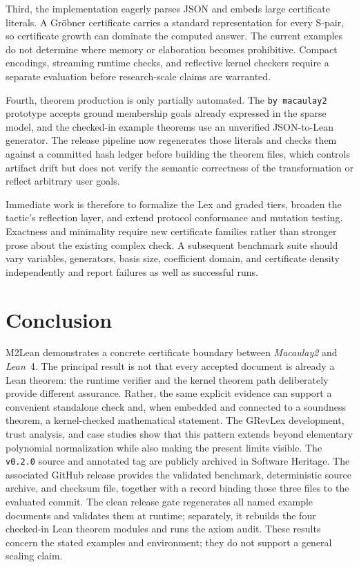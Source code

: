 \documentclass[11pt]{article}
\newcommand{\M}{\textit{Macaulay2}}
\newcommand{\lean}{\textit{Lean}}
\newcommand{\code}[1]{\texttt{#1}}
\begin{document}
Third, the implementation eagerly parses JSON and embeds large
certificate literals.  A Gr\"obner certificate carries a standard
representation for every S-pair, so certificate growth can dominate
the computed answer.  The current examples do not determine where
memory or elaboration becomes prohibitive.  Compact encodings,
streaming runtime checks, and reflective kernel checkers require a
separate evaluation before research-scale claims are warranted.

Fourth, theorem production is only partially automated.  The
\code{by macaulay2} prototype accepts ground membership goals already
expressed in the sparse model, and the checked-in example theorems use
an unverified JSON-to-Lean generator.  The release pipeline now
regenerates those literals and checks them against a committed hash ledger
before building the theorem files, which controls artifact drift but does
not verify the semantic correctness of the transformation or reflect
arbitrary user goals.

Immediate work is therefore to formalize the Lex and graded tiers,
broaden the tactic's reflection layer, and extend protocol conformance
and mutation testing.  Exactness and
minimality require new certificate families rather than stronger prose
about the existing complex check.  A subsequent benchmark suite should
vary variables, generators, basis size, coefficient domain, and
certificate density independently and report failures as well as
successful runs.

\section{Conclusion}\label{sec:conclusion}

M2Lean demonstrates a concrete certificate boundary between \M{} and
\lean{}~4.  The principal result is not that every accepted document
is already a Lean theorem: the runtime verifier and the kernel theorem
path deliberately provide different assurance.  Rather, the same
explicit evidence can support a convenient standalone check and, when
embedded and connected to a soundness theorem, a kernel-checked
mathematical statement.  The GRevLex development, trust analysis, and
case studies show that this pattern extends beyond elementary
polynomial normalization while also making the present limits visible.
The \code{v0.2.0} source and annotated tag are publicly archived in
Software Heritage.  The associated GitHub release provides the validated
benchmark, deterministic source archive, and checksum file, together with a
record binding those three files to the evaluated commit.  The clean release
gate regenerates all named example documents and validates them at runtime;
separately, it rebuilds the four checked-in Lean theorem modules and runs the
axiom audit.  These results concern the stated examples and environment; they
do not support a general scaling claim.
\end{document}
